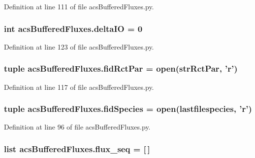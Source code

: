 Definition at line 111 of file acs\-Buffered\-Fluxes.\-py.

\hypertarget{a00098_ae908941897ea01dca9c2be46363f1845}{
\subsubsection[{delta\-I\-O}]{\setlength{\rightskip}{0pt plus 5cm}int acs\-Buffered\-Fluxes.\-delta\-I\-O = 0}}\label{a00098_ae908941897ea01dca9c2be46363f1845}


Definition at line 123 of file acs\-Buffered\-Fluxes.\-py.

\hypertarget{a00098_af949c46aab0625cd7bbed10b8a484f8b}{
\subsubsection[{fid\-Rct\-Par}]{\setlength{\rightskip}{0pt plus 5cm}tuple acs\-Buffered\-Fluxes.\-fid\-Rct\-Par = open({\bf str\-Rct\-Par}, '{\bf r}')}}\label{a00098_af949c46aab0625cd7bbed10b8a484f8b}


Definition at line 117 of file acs\-Buffered\-Fluxes.\-py.

\hypertarget{a00098_ad38778cd180f00344e8a8d68511f56fd}{
\subsubsection[{fid\-Species}]{\setlength{\rightskip}{0pt plus 5cm}tuple acs\-Buffered\-Fluxes.\-fid\-Species = open({\bf lastfilespecies}, '{\bf r}')}}\label{a00098_ad38778cd180f00344e8a8d68511f56fd}


Definition at line 96 of file acs\-Buffered\-Fluxes.\-py.

\hypertarget{a00098_a99cfaccf97d11133896704acd137057d}{
\subsubsection[{flux\-\_\-seq}]{\setlength{\rightskip}{0pt plus 5cm}list acs\-Buffered\-Fluxes.\-flux\-\_\-seq = \mbox{[}$\,$\mbox{]}}}\label{a00098_a99cfaccf97d11133896704acd137057d}


